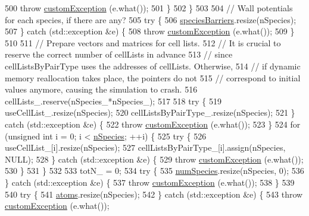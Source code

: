 \begin{DoxyCode}
500             \textcolor{keywordflow}{throw} \hyperlink{classcustom_exception}{customException} (e.what());
501         \}
502     \}
503 
504     \textcolor{comment}{// Wall potentials for each species, if there are any?}
505     \textcolor{keywordflow}{try} \{
506         \hyperlink{classsim_system_a5ae652ff4519f39c3862abae32a9581b}{speciesBarriers}.resize(nSpecies);
507     \} \textcolor{keywordflow}{catch} (std::exception &e) \{
508         \textcolor{keywordflow}{throw} \hyperlink{classcustom_exception}{customException} (e.what());
509     \}
510 
511     \textcolor{comment}{// Prepare vectors and matrices for cell lists.}
512     \textcolor{comment}{// It is crucial to reserve the correct number of cellLists in advance}
513     \textcolor{comment}{// since cellListsByPairType uses the addresses of cellLists. Otherwise,}
514     \textcolor{comment}{// if dynamic memory reallocation takes place, the pointers do not}
515     \textcolor{comment}{// correspond to initial values anymore, causing the simulation to crash.}
516     cellLists\_.reserve(nSpecies\_*nSpecies\_);
517 
518     \textcolor{keywordflow}{try} \{
519         useCellList\_.resize(nSpecies);
520         cellListsByPairType\_.resize(nSpecies);
521     \} \textcolor{keywordflow}{catch} (std::exception &e) \{
522         \textcolor{keywordflow}{throw} \hyperlink{classcustom_exception}{customException} (e.what());
523     \}
524     \textcolor{keywordflow}{for} (\textcolor{keywordtype}{unsigned} \textcolor{keywordtype}{int} i = 0; i < \hyperlink{classsim_system_ab5e2e9b6204de15520302fe1d51688dd}{nSpecies}; ++i) \{
525         \textcolor{keywordflow}{try} \{
526             useCellList\_[i].resize(nSpecies);
527             cellListsByPairType\_[i].assign(nSpecies, NULL);
528         \} \textcolor{keywordflow}{catch} (std::exception &e) \{
529             \textcolor{keywordflow}{throw} \hyperlink{classcustom_exception}{customException} (e.what());
530         \}
531     \}
532 
533     totN\_ = 0;
534         \textcolor{keywordflow}{try} \{
535         \hyperlink{classsim_system_a9eea865e6dc1cff377b1e79c4d9c23f0}{numSpecies}.resize(nSpecies, 0);
536     \} \textcolor{keywordflow}{catch} (std::exception &e) \{
537         \textcolor{keywordflow}{throw} \hyperlink{classcustom_exception}{customException} (e.what());
538     \}
539 
540     \textcolor{keywordflow}{try} \{
541         \hyperlink{classsim_system_a90421b19082f7fb8fc23b7264b1161e4}{atoms}.resize(nSpecies);
542     \} \textcolor{keywordflow}{catch} (std::exception &e) \{
543         \textcolor{keywordflow}{throw} \hyperlink{classcustom_exception}{customException} (e.what());

\end{DoxyCode}
